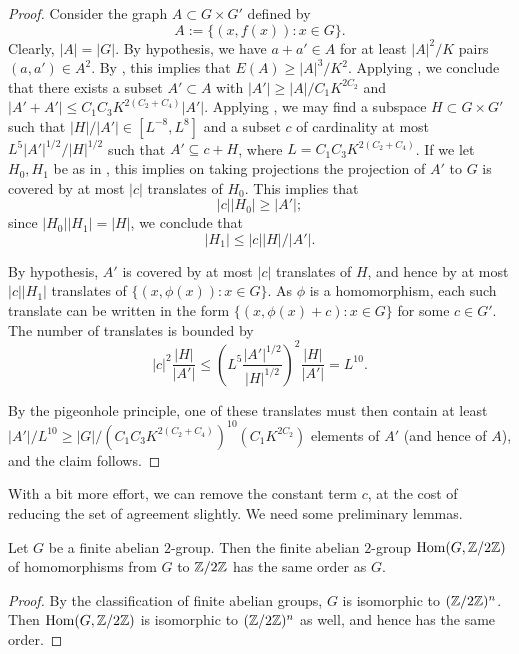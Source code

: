 \begin{proof}\leanok Consider the graph $A \subset G \times G'$ defined by
$$ A := \{ (x,f(x)): x \in G \}.$$
Clearly, $|A| = |G|$.  By hypothesis, we have $a+a' \in A$ for at least
$|A|^2/K$ pairs $(a,a') \in A^2$. By , this implies that $E(A)
\geq |A|^3/K^2$.  Applying , we conclude that there exists a subset
$A' \subset A$ with $|A'| \geq |A|/C_1 K^{2C_2}$ and $|A'+A'| \leq C_1C_3
K^{2(C_2+C_4)} |A'|$. Applying , we may find a subspace $H
\subset G \times G'$ such that $|H| / |A'| \in [L^{-8}, L^{8}]$ and a subset
$c$ of cardinality at most $L^5 |A'|^{1/2} / |H|^{1/2}$ such that $A'
\subseteq c + H$, where $L =  C_1C_3 K^{2(C_2+C_4)}$. If we let $H_0,H_1$ be
as in , this implies on taking projections the projection of
$A'$ to $G$ is covered by at most $|c|$ translates of $H_0$.  This implies
that
$$ |c| |H_0| \geq |A'|;$$
since $|H_0| |H_1| = |H|$, we conclude that
$$ |H_1| \leq |c| |H|/|A'|.$$

By hypothesis, $A'$ is covered by at most $|c|$ translates of $H$, and hence
by at most $|c| |H_1|$ translates of $\{ (x,\phi(x)): x \in G \}$.  As $\phi$
is a homomorphism, each such translate can be written in the form $\{
(x,\phi(x)+c): x \in G \}$ for some $c \in G'$. The number of translates is
bounded by
$$
|c|^2 \frac{|H|}{|A'|} \leq \left(L^5 \frac{|A'|^{1/2}}{|H|^{1/2}}\right)^2 \frac{|H|}{|A'|} = L^{10}.
$$

By the pigeonhole principle, one of these translates must then contain at
least $|A'|/L^{10} \geq |G| / (C_1C_3 K^{2(C_2+C_4)})^{10} (C_1 K^{2C_2})$
elements of $A'$ (and hence of $A$), and the claim follows.
\end{proof}

With a bit more effort, we can remove the constant term $c$, at the cost of reducing the set of agreement slightly.  We need some preliminary lemmas.

\begin{lemma}[Duality]\label{gdual}\leanok Let $G$ be a finite abelian $2$-group.  Then the finite abelian $2$-group $\mathrm{Hom}(G,\mathbb{Z}/2\mathbb{Z})$ of homomorphisms from $G$ to $\mathbb{Z}/2\mathbb{Z}$ has the same order as $G$.
\end{lemma}

\begin{proof}\leanok By the classification of finite abelian groups, $G$ is isomorphic to $(\mathbb{Z}/2\mathbb{Z})^n$.  Then $\mathrm{Hom}(G,\mathbb{Z}/2\mathbb{Z})$ is isomorphic to $(\mathbb{Z}/2\mathbb{Z})^n$ as well, and hence has the same order.
\end{proof}

